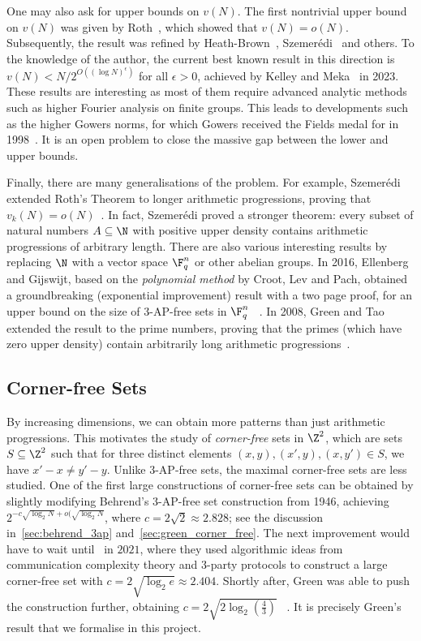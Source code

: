 One may also ask for upper bounds on \(v(N)\). The first nontrivial upper bound on \(v(N)\) was given by Roth~\cite{Roth1953}, which showed that \(v(N) = o(N)\). Subsequently, the result was refined by Heath-Brown~\cite{HeathBrown1987}, Szemerédi~\cite{Szemerédi1990} and others. To the knowledge of the author, the current best known result in this direction is \(v(N) < N / 2^{O((\log N)^{\epsilon})}\) for all \(\epsilon > 0\), achieved by Kelley and Meka~\cite{KelleyMeka2023} in 2023. These results are interesting as most of them require advanced analytic methods such as higher Fourier analysis on finite groups. This leads to developments such as the higher Gowers norms, for which Gowers received the Fields medal for in 1998~\cite{LLMM1999}. It is an open problem to close the massive gap between the lower and upper bounds.

Finally, there are many generalisations of the problem. For example, Szemerédi extended Roth's Theorem to longer arithmetic progressions, proving that \(v_k(N) = o(N)\)~\cite{Szemerédi1975}. In fact, Szemerédi proved a stronger theorem: every subset of natural numbers \(A \subseteq \N\) with positive upper density contains arithmetic progressions of arbitrary length. There are also various interesting results by replacing \(\N\) with a vector space \(\F_q^n\) or other abelian groups. In 2016, Ellenberg and Gijswijt, based on the \textit{polynomial method} by Croot, Lev and Pach, obtained a groundbreaking (exponential improvement) result with a two page proof, for an upper bound on the size of \(3\)-AP-free sets in \(\F_q^n\) ~\cite{EllenbergGijswijt2016}. In 2008, Green and Tao extended the result to the prime numbers, proving that the primes (which have zero upper density) contain arbitrarily long arithmetic progressions~\cite{GreenTao2008}.

\subsection{Corner-free Sets} \label{sec:corner_free}

By increasing dimensions, we can obtain more patterns than just arithmetic progressions. This motivates the study of \textit{corner-free} sets in \(\Z^2\), which are sets \(S \subseteq \Z^2\) such that for three distinct elements \((x, y), (x', y), (x, y') \in S\), we have \(x' - x \neq y' - y\). Unlike \(3\)-AP-free sets, the maximal corner-free sets are less studied. One of the first large constructions of corner-free sets can be obtained by slightly modifying Behrend's \(3\)-AP-free set construction from 1946, achieving \(2^{-c\sqrt{\log_2 N} + o(\sqrt{\log_2 N}}\), where \(c = 2\sqrt{2} \approx 2.828\); see the discussion in~\cref{sec:behrend_3ap} and~\cref{sec:green_corner_free}. The next improvement would have to wait until~\cite{LinialShraibman2021} in \(2021\), where they used algorithmic ideas from communication complexity theory and \(3\)-party protocols to construct a large corner-free set with \(c = 2\sqrt{\log_2 e} \approx 2.404\). Shortly after, Green was able to push the construction further, obtaining \(c = 2\sqrt{2\log_2\left(\frac{4}{3}\right)}\) ~\cite{Green2021}. It is precisely Green's result that we formalise in this project.
